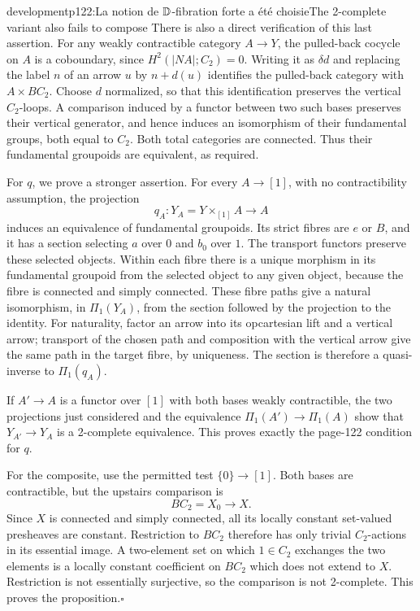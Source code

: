 \begin{dcomment}{development}{p122:La notion de $\mathbb{D}$-fibration forte a été choisie}{The 2-complete variant also fails to compose}
There is also a direct verification of this last assertion. For any weakly contractible category $A\to Y$, the pulled-back cocycle on $A$ is a coboundary, since $H^2(|NA|;C_2)=0$. Writing it as $\delta d$ and replacing the label $n$ of an arrow $u$ by $n+d(u)$ identifies the pulled-back category with $A\times BC_2$. Choose $d$ normalized, so that this identification preserves the vertical $C_2$-loops. A comparison induced by a functor between two such bases preserves their vertical generator, and hence induces an isomorphism of their fundamental groups, both equal to $C_2$. Both total categories are connected. Thus their fundamental groupoids are equivalent, as required.

For $q$, we prove a stronger assertion. For every $A\to[1]$, with no contractibility assumption, the projection
\[
 q_A:Y_A=Y\times_{[1]}A\longrightarrow A
\]
induces an equivalence of fundamental groupoids. Its strict fibres are $e$ or $B$, and it has a section selecting $a$ over $0$ and $b_0$ over $1$. The transport functors preserve these selected objects. Within each fibre there is a unique morphism in its fundamental groupoid from the selected object to any given object, because the fibre is connected and simply connected. These fibre paths give a natural isomorphism, in $\Pi_1(Y_A)$, from the section followed by the projection to the identity. For naturality, factor an arrow into its opcartesian lift and a vertical arrow; transport of the chosen path and composition with the vertical arrow give the same path in the target fibre, by uniqueness. The section is therefore a quasi-inverse to $\Pi_1(q_A)$.

If $A'\to A$ is a functor over $[1]$ with both bases weakly contractible, the two projections just considered and the equivalence $\Pi_1(A')\to\Pi_1(A)$ show that $Y_{A'}\to Y_A$ is a 2-complete equivalence. This proves exactly the page-122 condition for $q$.

For the composite, use the permitted test $\{0\}\to[1]$. Both bases are contractible, but the upstairs comparison is
\[
 BC_2=X_0\longrightarrow X.
\]
Since $X$ is connected and simply connected, all its locally constant set-valued presheaves are constant. Restriction to $BC_2$ therefore has only trivial $C_2$-actions in its essential image. A two-element set on which $1\in C_2$ exchanges the two elements is a locally constant coefficient on $BC_2$ which does not extend to $X$. Restriction is not essentially surjective, so the comparison is not 2-complete. This proves the proposition.\hfill$\square$


\end{dcomment}
